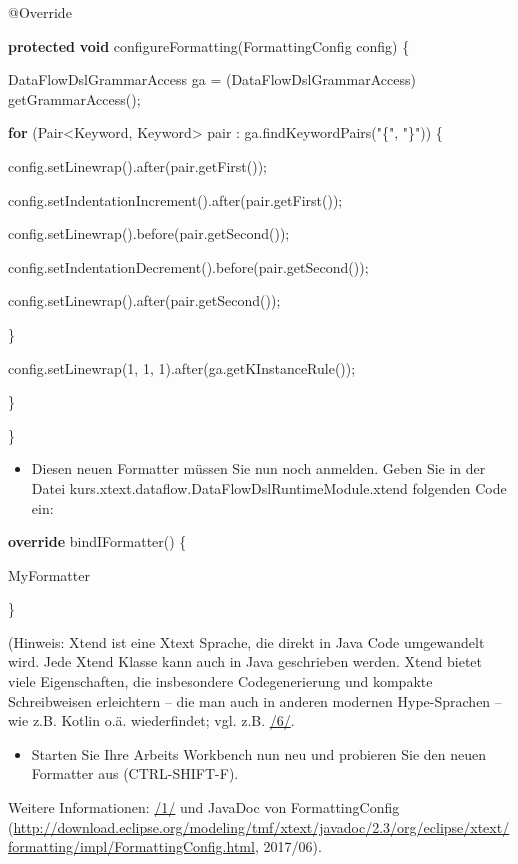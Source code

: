 \documentclass[a4]{article}
\providecommand{\tightlist}{%
  \setlength{\itemsep}{0pt}\setlength{\parskip}{0pt}}
\begin{document}
@Override

\textbf{protected} \textbf{void} configureFormatting(FormattingConfig
config) \{

DataFlowDslGrammarAccess ga = (DataFlowDslGrammarAccess)
getGrammarAccess();

\textbf{for} (Pair\textless{}Keyword, Keyword\textgreater{} pair :
ga.findKeywordPairs("\{", "\}")) \{

config.setLinewrap().after(pair.getFirst());

config.setIndentationIncrement().after(pair.getFirst());

config.setLinewrap().before(pair.getSecond());

config.setIndentationDecrement().before(pair.getSecond());

config.setLinewrap().after(pair.getSecond());

\}

config.setLinewrap(1, 1, 1).after(ga.getKInstanceRule());

\}

\}

\begin{itemize}
\tightlist
\item
  Diesen neuen Formatter müssen Sie nun noch anmelden. Geben Sie in der
  Datei kurs.xtext.dataflow.DataFlowDslRuntimeModule.xtend folgenden
  Code ein:
\end{itemize}

\textbf{override} bindIFormatter() \{

MyFormatter

\}

(Hinweis: Xtend ist eine Xtext Sprache, die direkt in Java Code
umgewandelt wird. Jede Xtend Klasse kann auch in Java geschrieben
werden. Xtend bietet viele Eigenschaften, die insbesondere
Codegenerierung und kompakte Schreibweisen erleichtern -- die man auch
in anderen modernen Hype-Sprachen -- wie z.B. Kotlin o.ä. wiederfindet;
vgl. z.B. \protect\hyperlink{anchor-11}{/6/}.

\begin{itemize}
\tightlist
\item
  Starten Sie Ihre Arbeits Workbench nun neu und probieren Sie den neuen
  Formatter aus (CTRL-SHIFT-F).
\end{itemize}

Weitere Informationen: \protect\hyperlink{anchor-1}{/1/} und JavaDoc von
FormattingConfig
(\url{http://download.eclipse.org/modeling/tmf/xtext/javadoc/2.3/org/eclipse/xtext/formatting/impl/FormattingConfig.html},
2017/06).
\end{document}
